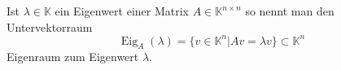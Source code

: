 Ist $\lambda \in \mathbb{K}$ ein Eigenwert einer Matrix $A \in \mathbb{K}^{n \times n}$ so nennt man den Untervektorraum
$$\operatorname{Eig}_A(\lambda) = \{v \in \mathbb{K}^n | A v = \lambda v\} \subset \mathbb{K}^n$$
Eigenraum zum Eigenwert $\lambda$.
